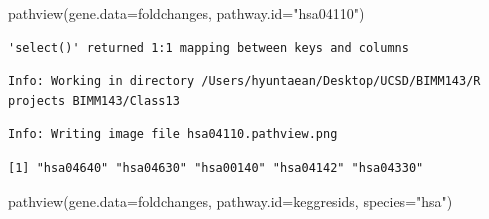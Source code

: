 \documentclass[
  letterpaper,
  DIV=11,
  numbers=noendperiod]{scrartcl}
\newenvironment{Shaded}{\begin{snugshade}}{\end{snugshade}}
\newcommand{\AttributeTok}[1]{\textcolor[rgb]{0.40,0.45,0.13}{#1}}
\newcommand{\CommentTok}[1]{\textcolor[rgb]{0.37,0.37,0.37}{#1}}
\newcommand{\DecValTok}[1]{\textcolor[rgb]{0.68,0.00,0.00}{#1}}
\newcommand{\DocumentationTok}[1]{\textcolor[rgb]{0.37,0.37,0.37}{\textit{#1}}}
\newcommand{\FunctionTok}[1]{\textcolor[rgb]{0.28,0.35,0.67}{#1}}
\newcommand{\NormalTok}[1]{\textcolor[rgb]{0.00,0.23,0.31}{#1}}
\newcommand{\OtherTok}[1]{\textcolor[rgb]{0.00,0.23,0.31}{#1}}
\newcommand{\SpecialCharTok}[1]{\textcolor[rgb]{0.37,0.37,0.37}{#1}}
\newcommand{\StringTok}[1]{\textcolor[rgb]{0.13,0.47,0.30}{#1}}
\begin{document}
\begin{Shaded}
\begin{Highlighting}[]
\FunctionTok{pathview}\NormalTok{(}\AttributeTok{gene.data=}\NormalTok{foldchanges, }\AttributeTok{pathway.id=}\StringTok{"hsa04110"}\NormalTok{)}
\end{Highlighting}
\end{Shaded}

\begin{verbatim}
'select()' returned 1:1 mapping between keys and columns
\end{verbatim}

\begin{verbatim}
Info: Working in directory /Users/hyuntaean/Desktop/UCSD/BIMM143/R projects BIMM143/Class13
\end{verbatim}

\begin{verbatim}
Info: Writing image file hsa04110.pathview.png
\end{verbatim}

\begin{Shaded}
\end{Shaded}

\begin{verbatim}
[1] "hsa04640" "hsa04630" "hsa00140" "hsa04142" "hsa04330"
\end{verbatim}

\begin{Shaded}
\begin{Highlighting}[]
\FunctionTok{pathview}\NormalTok{(}\AttributeTok{gene.data=}\NormalTok{foldchanges, }\AttributeTok{pathway.id=}\NormalTok{keggresids, }\AttributeTok{species=}\StringTok{"hsa"}\NormalTok{)}
\end{Highlighting}
\end{Shaded}
\end{document}
